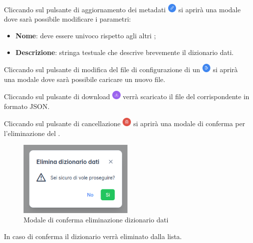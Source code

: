 Cliccando sul pulsante di aggiornamento dei metadati \includegraphics[height=1.2em]{assets/dd_edit_metadata_button.png} si aprirà una modale dove sarà possibile modificare i parametri:
\begin{itemize}
  \item \textbf{Nome}: deve essere univoco rispetto agli altri ;
  \item \textbf{Descrizione}: stringa testuale che descrive brevemente il dizionario dati.
\end{itemize}

Cliccando sul pulsante di modifica del file di configurazione di un  \includegraphics[height=1.2em]{assets/dd_edit_button.png} si aprirà una modale dove sarà possibile caricare un nuovo file.

Cliccando sul pulsante di download \includegraphics[height=1.2em]{assets/dd_download_button.png} verrà scaricato il file del  corrispondente in formato JSON.

Cliccando sul pulsante di cancellazione \includegraphics[height=1.2em]{assets/dd_delete_button.png} si aprirà una modale di conferma per l'eliminazione del .
\begin{figure}[H]
  \centering
  \includegraphics[width=0.5\textwidth]{assets/dd_confirm_delete.png}
  \caption{Modale di conferma eliminazione dizionario dati}
\end{figure}
In caso di conferma il dizionario verrà eliminato dalla lista.

